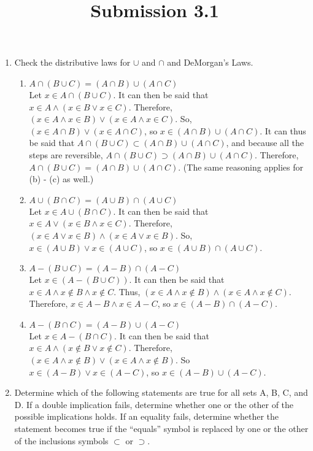 \documentclass{article}
\title{Submission 3.1}
\date{}
\begin{document}
\maketitle


\begin{enumerate}
      \item Check the distributive laws for $\cup$ and $\cap$ and DeMorgan's Laws.
            \begin{enumerate}
                  \item $A \cap (B \cup C) = (A \cap B) \cup (A \cap C)$\\
                        Let $x \in A \cap (B \cup C)$. It can then be said that $x \in A \land (x \in B \lor x \in C)$. Therefore, $(x \in A \land x \in B) \lor (x \in A \land x \in C)$. So, $(x \in A \cap B) \lor (x \in A \cap C)$, so $x \in (A \cap B) \cup (A \cap C)$. It can thus be said that $A \cap (B \cup C) \subset (A \cap B) \cup (A \cap C)$, and because all the steps are reversible, $A \cap (B \cup C) \supset (A \cap B) \cup (A \cap C)$. Therefore, $A \cap (B \cup C) = (A \cap B) \cup (A \cap C)$. (The same reasoning applies for (b) - (c) as well.)
                  \item $A \cup (B \cap C) = (A \cup B) \cap (A \cup C)$\\
                        Let $x \in A \cup (B \cap C)$. It can then be said that $x \in A \lor (x \in B \land x \in C)$. Therefore, $(x \in A \lor x \in B) \land (x \in A \lor x \in B)$. So, $x \in (A \cup B) \lor x \in (A \cup C)$, so $x \in (A \cup B) \cap (A \cup C)$.
                  \item $A - (B \cup C) = (A - B) \cap (A - C)$\\
                        Let $x \in (A - (B \cup C))$. It can then be said that $x \in A \land x \notin B \land x \notin C$. Thus, $(x \in A \land x \notin B) \land (x \in A \land x \notin C)$. Therefore, $x \in A - B \land x \in A - C$, so $x \in (A - B) \cap (A - C)$.
                  \item $A - (B \cap C) = (A - B) \cup (A - C)$\\
                        Let $x \in A - (B \cap C)$. It can then be said that $x \in A \land (x \notin B \lor x \notin C)$. Therefore, $(x \in A \land x \notin B) \lor (x \in A \land x \notin B)$. So $x \in (A - B) \lor x \in (A - C)$, so $x \in (A - B) \cup (A - C)$.
            \end{enumerate}
      \item Determine which of the following statements are true for all sets A, B, C, and D. If a double implication fails, determine whether one or the other of the possible implications holds. If an equality fails, determine whether the statement becomes true if the “equals” symbol is replaced by one or the other of the inclusions symbols $\subset$ or $\supset$.

\end{enumerate}
\end{document}
